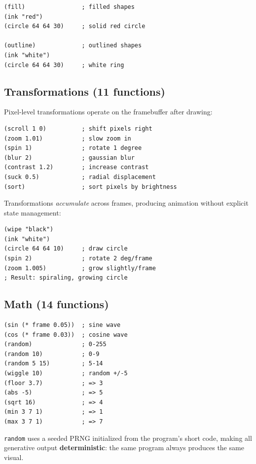 \documentclass[10pt,letterpaper,twocolumn]{article}
\begin{document}
\begin{lstlisting}
(fill)                ; filled shapes
(ink "red")
(circle 64 64 30)     ; solid red circle

(outline)             ; outlined shapes
(ink "white")
(circle 64 64 30)     ; white ring
\end{lstlisting}

\subsection{Transformations (11 functions)}

Pixel-level transformations operate on the framebuffer after drawing:

\begin{lstlisting}
(scroll 1 0)          ; shift pixels right
(zoom 1.01)           ; slow zoom in
(spin 1)              ; rotate 1 degree
(blur 2)              ; gaussian blur
(contrast 1.2)        ; increase contrast
(suck 0.5)            ; radial displacement
(sort)                ; sort pixels by brightness
\end{lstlisting}

Transformations \emph{accumulate} across frames, producing animation without explicit state management:

\begin{lstlisting}
(wipe "black")
(ink "white")
(circle 64 64 10)     ; draw circle
(spin 2)              ; rotate 2 deg/frame
(zoom 1.005)          ; grow slightly/frame
; Result: spiraling, growing circle
\end{lstlisting}

\subsection{Math (14 functions)}

\begin{lstlisting}
(sin (* frame 0.05))  ; sine wave
(cos (* frame 0.03))  ; cosine wave
(random)              ; 0-255
(random 10)           ; 0-9
(random 5 15)         ; 5-14
(wiggle 10)           ; random +/-5
(floor 3.7)           ; => 3
(abs -5)              ; => 5
(sqrt 16)             ; => 4
(min 3 7 1)           ; => 1
(max 3 7 1)           ; => 7
\end{lstlisting}

\texttt{random} uses a seeded PRNG initialized from the program's short code, making all generative output \textbf{deterministic}: the same program always produces the same visual.
\end{document}
